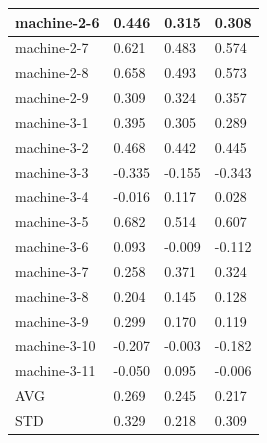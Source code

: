 \begin{table}[]
{\begin{tabular}{|l|l|l|l|}
		machine-2-6     & 0.446                                  & 0.315                                 & 0.308                         \\ \hline
		machine-2-7     & 0.621                                  & 0.483                                 & 0.574                         \\ \hline
		machine-2-8     & 0.658                                  & 0.493                                 & 0.573                         \\ \hline
		machine-2-9     & 0.309                                  & 0.324                                 & 0.357                         \\ \hline
		machine-3-1     & 0.395                                  & 0.305                                 & 0.289                         \\ \hline
		machine-3-2     & 0.468                                  & 0.442                                 & 0.445                         \\ \hline
		machine-3-3     & -0.335                                 & -0.155                                & -0.343                        \\ \hline
		machine-3-4     & -0.016                                 & 0.117                                 & 0.028                         \\ \hline
		machine-3-5     & 0.682                                  & 0.514                                 & 0.607                         \\ \hline
		machine-3-6     & 0.093                                  & -0.009                                & -0.112                        \\ \hline
		machine-3-7     & 0.258                                  & 0.371                                 & 0.324                         \\ \hline
		machine-3-8     & 0.204                                  & 0.145                                 & 0.128                         \\ \hline
		machine-3-9     & 0.299                                  & 0.170                                 & 0.119                         \\ \hline
		machine-3-10    & -0.207                                 & -0.003                                & -0.182                        \\ \hline
		machine-3-11    & -0.050                                 & 0.095                                 & -0.006                        \\ \hline
		AVG             & 0.269                                  & 0.245                                 & 0.217                         \\ \hline
		STD             & 0.329                                  & 0.218                                 & 0.309                         \\ \hline
	\end{tabular}%
}
\end{table}

